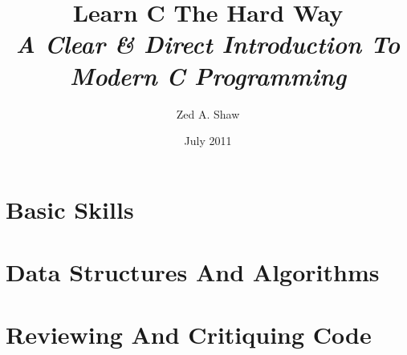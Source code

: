 


\title{
    Learn C The Hard Way\\
    \textit{A Clear \& Direct Introduction To Modern C Programming}
}
\author{Zed A. Shaw}
\date{July 2011}



\frontmatter

\maketitle

\tableofcontents


\mainmatter



\part{Basic Skills}




























\part{Data Structures And Algorithms}




























\part{Reviewing And Critiquing Code}


\appendix



